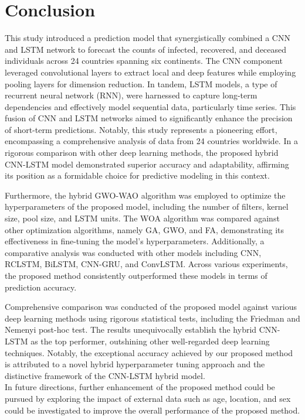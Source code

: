 \documentclass{article}
\begin{document}
\section{Conclusion}
 This study introduced a prediction model that synergistically combined a CNN and LSTM network to forecast the counts of infected, recovered, and deceased individuals across 24 countries spanning six continents. The CNN component leveraged convolutional layers to extract local and deep features while employing pooling layers for dimension reduction. In tandem, LSTM models, a type of recurrent neural network (RNN), were harnessed to capture long-term dependencies and effectively model sequential data, particularly time series. This fusion of CNN and LSTM networks aimed to significantly enhance the precision of short-term predictions. Notably, this study represents a pioneering effort, encompassing a comprehensive analysis of data from 24 countries worldwide. In a rigorous comparison with other deep learning methods, the proposed hybrid CNN-LSTM model demonstrated superior accuracy and adaptability, affirming its position as a formidable choice for predictive modeling in this context.

Furthermore, the hybrid GWO-WAO algorithm was employed to optimize the hyperparameters of the proposed model, including the number of filters, kernel size, pool size, and LSTM units. The WOA algorithm was compared against other optimization algorithms, namely GA, GWO, and FA, demonstrating its effectiveness in fine-tuning the model's hyperparameters. 
Additionally, a comparative analysis was conducted with other models including CNN, RCLSTM, BiLSTM, CNN-GRU, and ConvLSTM. Across various experiments, the proposed method consistently outperformed these models in terms of prediction accuracy.
 
Comprehensive comparison was conducted of the proposed model against various deep learning methods using rigorous statistical tests, including the Friedman and Nemenyi post-hoc test. The results unequivocally establish the hybrid CNN-LSTM as the top performer, outshining other well-regarded deep learning techniques. Notably, the exceptional accuracy achieved by our proposed method is attributed to a novel hybrid hyperparameter tuning approach and the distinctive framework of the CNN-LSTM hybrid model.\\
In future directions, further enhancement of the proposed method could be pursued by  exploring the impact of external data such as age, location, and sex could be investigated to improve the overall performance of the proposed method.





\printbibliography{}
\end{document}
